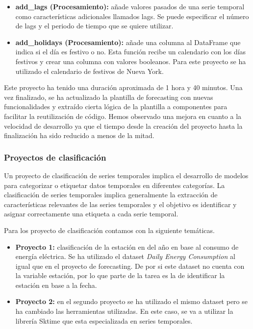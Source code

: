 \begin{itemize}
    \item \textbf{add\_lags (Procesamiento):} añade valores pasados de una serie temporal
    como características adicionales llamados lags. Se puede especificar el número de lags
    y el periodo de tiempo que se quiere utilizar.
    \item \textbf{add\_holidays (Procesamiento):} añade una columna al DataFrame que indica
    si el día es festivo o no. Esta función recibe un calendario con los días festivos
    y crear una columna con valores booleanos. Para este proyecto se ha utilizado el calendario
    de festivos de Nueva York.
\end{itemize}

Este proyecto ha tenido una duración aproximada de 1 hora y 40 minutos. Una vez finalizado,
se ha actualizado la plantilla de forecasting con nuevas funcionalidades y extraído cierta
lógica de la plantilla a componentes para facilitar la reutilización de código. Hemos observado 
una mejora en cuanto a la velocidad de desarrollo ya que el tiempo desde la creación del proyecto
hasta la finalización ha sido reducido a menos de la mitad.

\subsubsection{Proyectos de clasificación}
Un proyecto de clasificación de series temporales implica el desarrollo de modelos para 
categorizar o etiquetar datos temporales en diferentes categorías. La clasificación de 
series temporales implica generalmente la extracción de características relevantes 
de las series temporales y el objetivo es identificar y asignar correctamente una 
etiqueta a cada serie temporal.\medskip

Para los proyecto de clasificación contamos con la siguiente temáticas.

\begin{itemize}
    \item \textbf{Proyecto 1:} clasificación de la estación en del año en base al consumo de energía eléctrica.
    Se ha utilizado el dataset \textit{Daily Energy Consumption} \cite{Hourly_Energy} al igual
    que en el proyecto de forecasting. De por si este dataset no cuenta con la variable estación,
    por lo que parte de la tarea es la de identificar la estación en base a la fecha.
    \item \textbf{Proyecto 2:} en el segundo proyecto se ha utilizado el mismo dataset pero se ha
    cambiado las herramientas utilizadas. En este caso, se va a utilizar la librería 
    Sktime \cite{Sktime} que esta especializada en series temporales.
\end{itemize}

